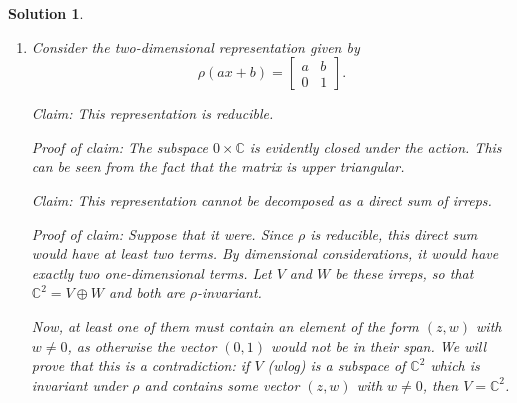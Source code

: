 \documentclass{article}
\theoremstyle{nonumberplain}
\newtheorem{sol}{Solution}
\newcommand{\C}{\mathbb{C}}
\DeclarePairedDelimiter{\abs}{\lvert}{\rvert}
\begin{document}
\begin{sol}
\begin{enumerate}
\smallskip

Now, let us find a right-invariant measure $\mu$. Similar computations hold until the change of variable, at which point, if we set $(z,w) = (x,y) \circ (a,b)^{-1}$, we obtain
\begin{equation}
\begin{cases}
z = \frac xa,\\
w = y - \frac ba x.
\end{cases}
\end{equation}

Then, upon applying change of variable, \eqref{eq:mu1} develops as
\begin{equation}
\eqref{eq:mu1} = \int_E f(az,bz+w) \abs a \dl2z \dl2 w,
\end{equation}
so that we wish to solve the functional equation
\begin{equation}
f(z,w) = \abs a f(az,bz+w).
\end{equation}

A solution to this equation is given by $f(z,w) = \frac1{\abs z}$. Thus, we get the right-invariant measure
\begin{equation}
\dl\mu = \frac1{\abs a} \dl2a \dl2b.
\end{equation}

\item Consider the two-dimensional representation given by
\begin{equation}
\rho(ax+b) = \begin{bmatrix}
a & b \\
0 & 1
\end{bmatrix}.
\end{equation}

Claim: This representation is reducible.

Proof of claim: The subspace $0 \times \C$ is evidently closed under the action. This can be seen from the fact that the matrix is upper triangular.

Claim: This representation cannot be decomposed as a direct sum of irreps.

Proof of claim: Suppose that it were. Since $\rho$ is reducible, this direct sum would have at least two terms. By dimensional considerations, it would have exactly two one-dimensional terms. Let $V$ and $W$ be these irreps, so that $\C^2 = V \oplus W$ and both are $\rho$-invariant.

Now, at least one of them must contain an element of the form $(z,w)$ with $w \neq 0$, as otherwise the vector $(0,1)$ would not be in their span. We will prove that this is a contradiction: if $V$ (wlog) is a subspace of $\C^2$ which is invariant under $\rho$ and contains some vector $(z,w)$ with $w \neq 0$, then $V = \C^2$.


\end{enumerate}
\end{sol}
\end{document}

